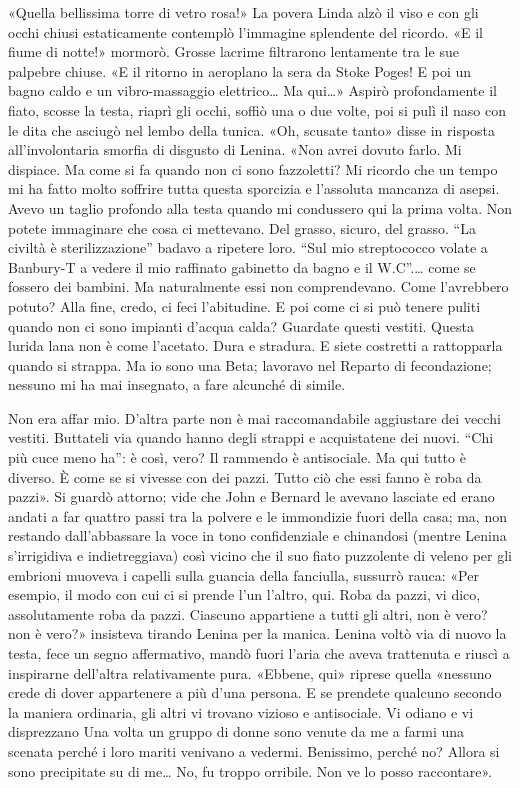 \documentclass[
a5paper, %
10pt, %
twoside, 
onecolumn, %
openany, %
]{memoir}
\begin{document}
«Quella bellissima torre di vetro rosa!» La povera Linda alzò il viso e con gli occhi chiusi estaticamente contemplò l’immagine splendente del ricordo. «E il fiume di notte!» mormorò. Grosse lacrime filtrarono lentamente tra le sue palpebre chiuse. «E il ritorno in aeroplano la sera da Stoke Poges! E poi un bagno caldo e un vibro-massaggio elettrico… Ma qui…» Aspirò profondamente il fiato, scosse la testa, riaprì gli occhi, soffiò una o due volte, poi si pulì il naso con le dita che asciugò nel lembo della tunica. «Oh, scusate tanto» disse in risposta all’involontaria smorfia di disgusto di Lenina. «Non avrei dovuto farlo. Mi dispiace. Ma come si fa quando non ci sono fazzoletti? Mi ricordo che un tempo mi ha fatto molto soffrire tutta questa sporcizia e l’assoluta mancanza di asepsi. Avevo un taglio profondo alla testa quando mi condussero qui la prima volta. Non potete immaginare che cosa ci mettevano. Del grasso, sicuro, del grasso. “La civiltà è sterilizzazione” badavo a ripetere loro. “Sul mio streptococco volate a Banbury-T a vedere il mio raffinato gabinetto da bagno e il W.C”.… come se fossero dei bambini. Ma naturalmente essi non comprendevano. Come l’avrebbero potuto? Alla fine, credo, ci feci l’abitudine. E poi come ci si può tenere puliti quando non ci sono impianti d’acqua calda? Guardate questi vestiti. Questa lurida lana non è come l’acetato. Dura e stradura. E siete costretti a rattopparla quando si strappa. Ma io sono una Beta; lavoravo nel Reparto di fecondazione; nessuno mi ha mai insegnato, a fare alcunché di simile.

Non era affar mio. D’altra parte non è mai raccomandabile aggiustare dei vecchi vestiti. Buttateli via quando hanno degli strappi e acquistatene dei nuovi. “Chi più cuce meno ha”: è così, vero? Il rammendo è antisociale. Ma qui tutto è diverso. È come se si vivesse con dei pazzi. Tutto ciò che essi fanno è roba da pazzi». Si guardò attorno; vide che John e Bernard le avevano lasciate ed erano andati a far quattro passi tra la polvere e le immondizie fuori della casa; ma, non restando dall’abbassare la voce in tono confidenziale e chinandosi (mentre Lenina s’irrigidiva e indietreggiava) così vicino che il suo fiato puzzolente di veleno per gli embrioni muoveva i capelli sulla guancia della fanciulla, sussurrò rauca: «Per esempio, il modo con cui ci si prende l’un l’altro, qui. Roba da pazzi, vi dico, assolutamente roba da pazzi. Ciascuno appartiene a tutti gli altri, non è vero? non è vero?» insisteva tirando Lenina per la manica. Lenina voltò via di nuovo la testa, fece un segno affermativo, mandò fuori l’aria che aveva trattenuta e riuscì a inspirarne dell’altra relativamente pura. «Ebbene, qui» riprese quella «nessuno crede di dover appartenere a più d’una persona. E se prendete qualcuno secondo la maniera ordinaria, gli altri vi trovano vizioso e antisociale. Vi odiano e vi disprezzano Una volta un gruppo di donne sono venute da me a farmi una scenata perché i loro mariti venivano a vedermi. Benissimo, perché no? Allora si sono precipitate su di me… No, fu troppo orribile. Non ve lo posso raccontare».
\end{document}
